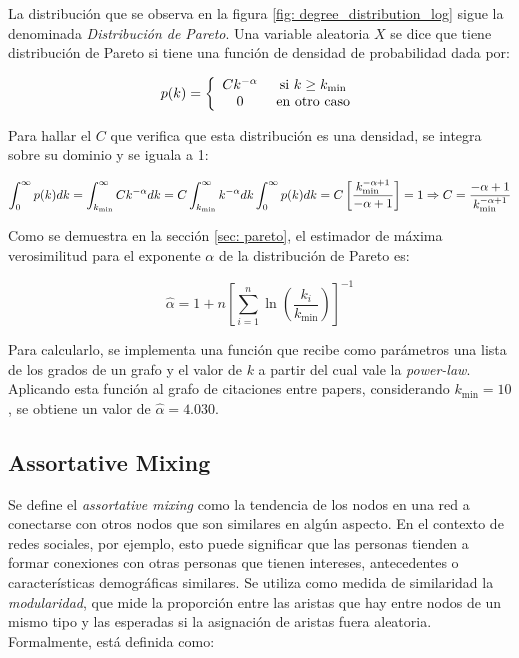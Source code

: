 \documentclass{article}
\begin{document}
La distribución que se observa en la figura \ref{fig: degree_distribution_log} sigue la denominada \textit{Distribución de Pareto}. Una variable aleatoria $X$ se dice que tiene distribución de Pareto si tiene una función de densidad de probabilidad dada por:

\begin{equation}
    \label{eq:pareto}
    p(k) = \left\lbrace \begin{array}{c c} C k^{-\alpha} & \text{ si } k\geq k_\text{min} \\ 0 & \text{ en otro caso} \end{array}\right.
\end{equation}


Para hallar el $C$ que verifica que esta distribución es una densidad, se integra sobre su dominio y se iguala a 1:

$$
    \int_{0}^{\infty} p(k) dk = \int_{k_{\text{min}}}^{\infty} C k^{-\alpha} dk = C \int_{k_{\text{min}}}^{\infty} k^{-\alpha}dk \\
    \int_{0}^{\infty} p(k) dk = C \left[ \frac{k_{\text{min}}^{-\alpha+1}}{-\alpha+1} \right] = 1 \\
    \Rightarrow C = \frac{-\alpha+1}{k_{\text{min}}^{-\alpha+1}}
$$


Como se demuestra en la sección \ref{sec: pareto}, el estimador de máxima verosimilitud para el exponente $\alpha$ de la distribución de Pareto es:

\begin{equation}
    \label{eq: alpha_pareto}
    \hat{\alpha} = 1 + n \left[ \sum_{i=1}^{n} \ln\left(\frac{k_i}{k_{\text{min}}}\right) \right]^{-1}
\end{equation}

Para calcularlo, se implementa una función que recibe como parámetros una lista de los grados de un grafo y el valor de $k$ a partir del cual vale la \textit{power-law}. Aplicando esta función al grafo de citaciones entre papers, considerando $k_{\text{min}} = 10$, se obtiene un valor de $\hat{\alpha} = 4.030$.

\subsection{Assortative Mixing}

Se define el \textit{assortative mixing} como la tendencia de los nodos en una red a conectarse con otros nodos que son similares en algún aspecto. En el contexto de redes sociales, por ejemplo, esto puede significar que las personas tienden a formar conexiones con otras personas que tienen intereses, antecedentes o características demográficas similares. Se utiliza como medida de similaridad la \textit{modularidad}, que mide la proporción entre las aristas que hay entre nodos de un mismo tipo y las esperadas si la asignación de aristas fuera aleatoria. Formalmente, está definida como:
\end{document}
